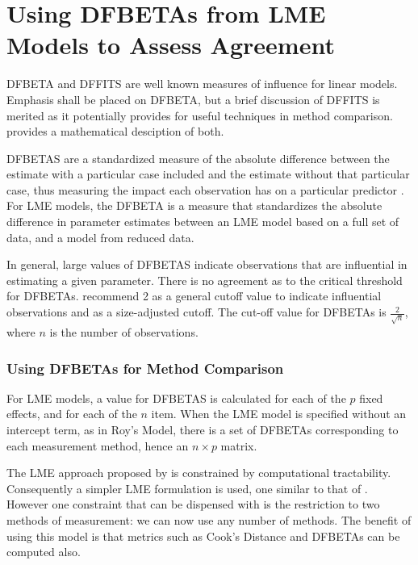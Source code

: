 \documentclass[12pt, a4paper]{report}
\theoremstyle{definition}
\theoremstyle{remark}
\begin{document}
\section{Using DFBETAs from LME Models to Assess Agreement}

DFBETA and DFFITS are well known measures of influence for linear models. Emphasis shall be placed on DFBETA, but a brief discussion of DFFITS is merited as it potentially provides for useful techniques in method comparison. \citet{schabenberger} provides a mathematical desciption of both.


DFBETAS are a standardized measure of the absolute difference between the estimate with a particular
case included and the estimate without that particular case, thus measuring the impact each observation has on a particular predictor \citep{belsley2005}. For LME models, the DFBETA is a measure that standardizes the absolute difference in parameter estimates between an LME model based on a full set of data, and a model from reduced data.

In general, large values of DFBETAS indicate observations that are influential in estimating a given parameter. There is no agreement as to the critical threshold for DFBETAs. \citet{belsley2005} recommend 2 as a general cutoff value to indicate influential observations and as a size-adjusted cutoff.  The cut-off value for DFBETAs is $\frac{2}{\sqrt{n}}$, where $n$ is the number of observations. 



\subsubsection{Using DFBETAs for Method Comparison}
For LME models, a value for DFBETAS is calculated for each of the $p$ fixed effects, and for each of the $n$ item. When the LME model is specified without an intercept term, as in Roy's Model, there is a set of DFBETAs corresponding to each measurement method, hence an $n \times p$ matrix.

The LME approach proposed by \citet{ARoy2009} is constrained by computational tractability. Consequently a simpler LME formulation is used, one similar to that of \citet{BXC2008}. However one constraint that can be dispensed with is the restriction to two methods of measurement: we can now use any number of methods. The benefit of using this model is that metrics such as Cook's Distance and DFBETAs can be computed also.
\end{document}

